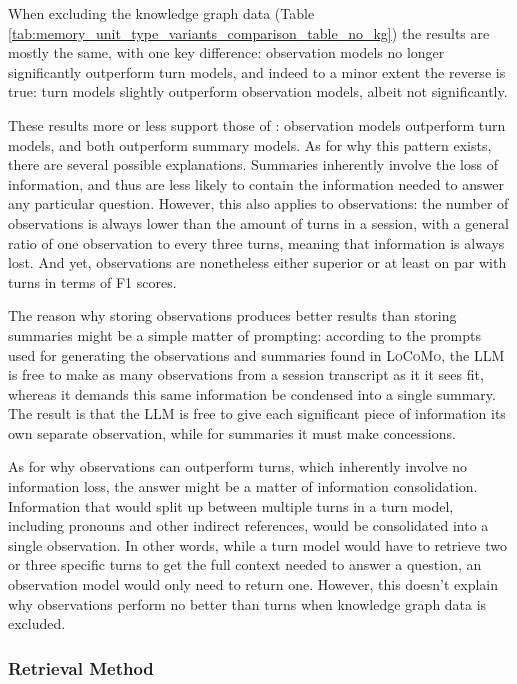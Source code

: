 When excluding the knowledge graph data (Table \ref{tab:memory_unit_type_variants_comparison_table_no_kg}) the results are mostly the same, with one key difference: observation models no longer significantly outperform turn models, and indeed to a minor extent the reverse is true: turn models slightly outperform observation models, albeit not significantly.

These results more or less support those of \cite{Maharana2024}: observation models outperform turn models, and both outperform summary models. As for why this pattern exists, there are several possible explanations. Summaries inherently involve the loss of information, and thus are less likely to contain the information needed to answer any particular question. However, this also applies to observations: the number of observations is always lower than the amount of turns in a session, with a general ratio of one observation to every three turns, meaning that information is always lost. And yet, observations are nonetheless either superior or at least on par with turns in terms of F1 scores.

The reason why storing observations produces better results than storing summaries might be a simple matter of prompting: according to the prompts used for generating the observations and summaries found in \textsc{LoCoMo}, the LLM is free to make as many observations from a session transcript as it it sees fit, whereas it demands this same information be condensed into a single summary. The result is that the LLM is free to give each significant piece of information its own separate observation, while for summaries it must make concessions. 

As for why observations can outperform turns, which inherently involve no information loss, the answer might be a matter of information consolidation. Information that would split up between multiple turns in a turn model, including pronouns and other indirect references, would be consolidated into a single observation. In other words, while a turn model would have to retrieve two or three specific turns to get the full context needed to answer a question, an observation model would only need to return one. However, this doesn't explain why observations perform no better than turns when knowledge graph data is excluded. 


\subsubsection{Retrieval Method}


